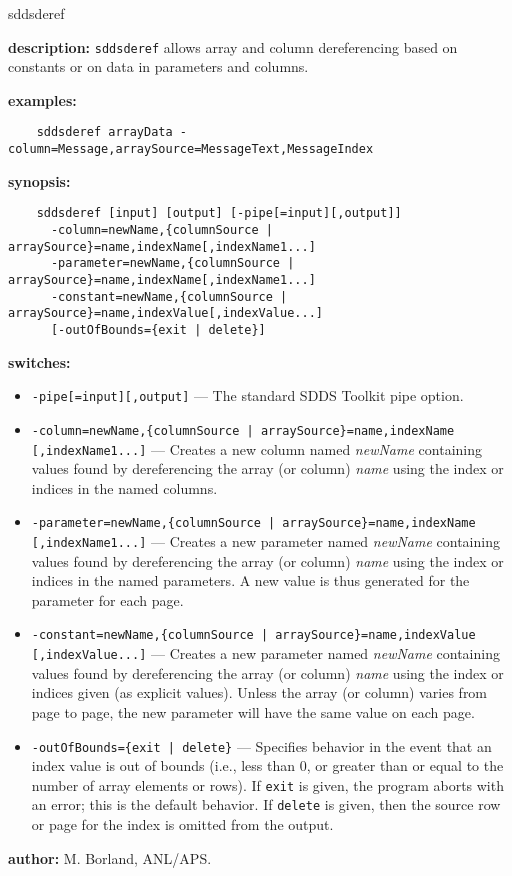 \begin{sddsprog}{sddsderef}
  \item \textbf{description:} \verb|sddsderef| allows array and column dereferencing based on constants or on data in parameters and columns.
  \item \textbf{examples:}
    \begin{verbatim}
    sddsderef arrayData -column=Message,arraySource=MessageText,MessageIndex
    \end{verbatim}
  \item \textbf{synopsis:}
    \begin{verbatim}
    sddsderef [input] [output] [-pipe[=input][,output]]
      -column=newName,{columnSource | arraySource}=name,indexName[,indexName1...]
      -parameter=newName,{columnSource | arraySource}=name,indexName[,indexName1...]
      -constant=newName,{columnSource | arraySource}=name,indexValue[,indexValue...]
      [-outOfBounds={exit | delete}]
    \end{verbatim}
  \item \textbf{switches:}
    \begin{itemize}
      \item \verb|-pipe[=input][,output]| --- The standard SDDS Toolkit pipe option.
      \item \verb!-column=newName,{columnSource | arraySource}=name,indexName! \verb|[,indexName1...]| --- Creates a new column named \emph{newName} containing values found by dereferencing the array (or column) \emph{name} using the index or indices in the named columns.
      \item \verb!-parameter=newName,{columnSource | arraySource}=name,indexName! \verb|[,indexName1...]| --- Creates a new parameter named \emph{newName} containing values found by dereferencing the array (or column) \emph{name} using the index or indices in the named parameters. A new value is thus generated for the parameter for each page.
      \item \verb!-constant=newName,{columnSource | arraySource}=name,indexValue! \verb|[,indexValue...]| --- Creates a new parameter named \emph{newName} containing values found by dereferencing the array (or column) \emph{name} using the index or indices given (as explicit values). Unless the array (or column) varies from page to page, the new parameter will have the same value on each page.
      \item \verb!-outOfBounds={exit | delete}! --- Specifies behavior in the event that an index value is out of bounds (i.e., less than 0, or greater than or equal to the number of array elements or rows). If \verb|exit| is given, the program aborts with an error; this is the default behavior. If \verb|delete| is given, then the source row or page for the index is omitted from the output.
    \end{itemize}
  \item \textbf{author:} M. Borland, ANL/APS.
\end{sddsprog}

